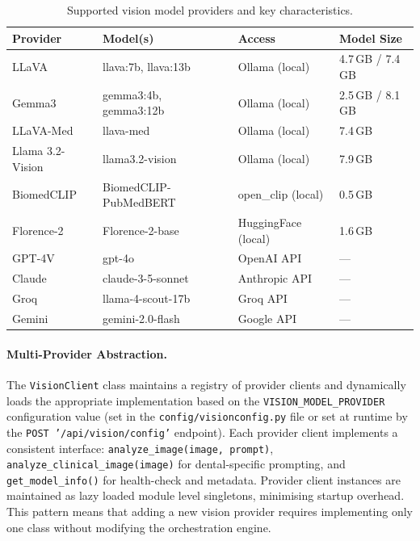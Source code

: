 \documentclass[12pt,a4paper]{report}
\begin{document}
	\begin{table}[h]
		\centering
		\caption{Supported vision model providers and key characteristics.}
		\label{tab:vision_providers}
		\begin{tabular}{llll}
			\toprule
			\textbf{Provider} & \textbf{Model(s)} & \textbf{Access} & \textbf{Model Size} \\
			\midrule
			LLaVA           & llava:7b, llava:13b          & Ollama (local)     & 4.7\,GB / 7.4\,GB \\
			Gemma3          & gemma3:4b, gemma3:12b        & Ollama (local)     & 2.5\,GB / 8.1\,GB \\
			LLaVA-Med       & llava-med                    & Ollama (local)     & 7.4\,GB \\
			Llama 3.2-Vision& llama3.2-vision              & Ollama (local)     & 7.9\,GB \\
			BiomedCLIP      & BiomedCLIP-PubMedBERT        & open\_clip (local) & 0.5\,GB \\
			Florence-2      & Florence-2-base              & HuggingFace (local)& 1.6\,GB \\
			GPT-4V          & gpt-4o                       & OpenAI API         & --- \\
			Claude          & claude-3-5-sonnet            & Anthropic API      & --- \\
			Groq            & llama-4-scout-17b            & Groq API           & --- \\
			Gemini          & gemini-2.0-flash             & Google API         & --- \\
			\bottomrule
		\end{tabular}
	\end{table}
	
	
	\paragraph{Multi-Provider Abstraction.}
	The \texttt{VisionClient} class maintains a registry of provider clients and dynamically
	loads the appropriate implementation based on the \texttt{VISION\_MODEL\_PROVIDER}
	configuration value (set in the \texttt{config/visionconfig.py} file or set at runtime by the \texttt{POST '/api/vision/config'} endpoint). Each provider client implements a consistent interface:
	\texttt{analyze\_image(image,~prompt)}, \texttt{analyze\_clinical\_image(image)} for
	dental-specific prompting, and \texttt{get\_model\_info()} for health-check and metadata.
	Provider client instances are maintained as lazy loaded module level singletons, minimising
	startup overhead. This pattern means that adding a new vision provider requires implementing
	only one class without modifying the orchestration engine.
	
\end{document}
